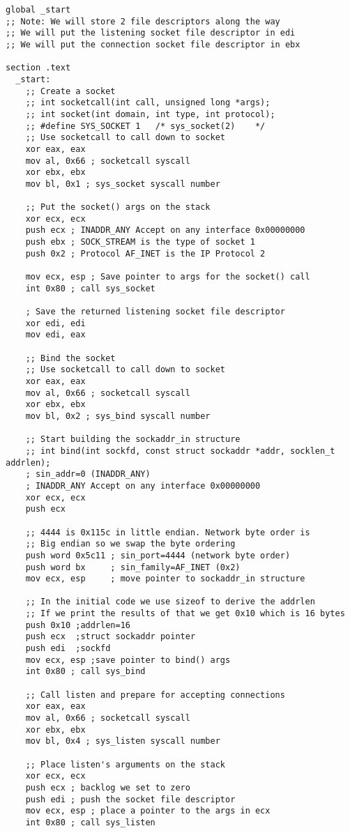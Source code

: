 \documentclass[11pt]{article}
\begin{document}
\begin{verbatim}
global _start
;; Note: We will store 2 file descriptors along the way
;; We will put the listening socket file descriptor in edi
;; We will put the connection socket file descriptor in ebx

section .text
  _start:
    ;; Create a socket
    ;; int socketcall(int call, unsigned long *args);
    ;; int socket(int domain, int type, int protocol);
    ;; #define SYS_SOCKET 1   /* sys_socket(2)    */
    ;; Use socketcall to call down to socket
    xor eax, eax
    mov al, 0x66 ; socketcall syscall
    xor ebx, ebx
    mov bl, 0x1 ; sys_socket syscall number

    ;; Put the socket() args on the stack
    xor ecx, ecx
    push ecx ; INADDR_ANY Accept on any interface 0x00000000
    push ebx ; SOCK_STREAM is the type of socket 1
    push 0x2 ; Protocol AF_INET is the IP Protocol 2

    mov ecx, esp ; Save pointer to args for the socket() call
    int 0x80 ; call sys_socket

    ; Save the returned listening socket file descriptor
    xor edi, edi
    mov edi, eax

    ;; Bind the socket
    ;; Use socketcall to call down to socket
    xor eax, eax
    mov al, 0x66 ; socketcall syscall
    xor ebx, ebx
    mov bl, 0x2 ; sys_bind syscall number

    ;; Start building the sockaddr_in structure
    ;; int bind(int sockfd, const struct sockaddr *addr, socklen_t addrlen);
    ; sin_addr=0 (INADDR_ANY)
    ; INADDR_ANY Accept on any interface 0x00000000
    xor ecx, ecx
    push ecx

    ;; 4444 is 0x115c in little endian. Network byte order is
    ;; Big endian so we swap the byte ordering
    push word 0x5c11 ; sin_port=4444 (network byte order)
    push word bx     ; sin_family=AF_INET (0x2)
    mov ecx, esp     ; move pointer to sockaddr_in structure

    ;; In the initial code we use sizeof to derive the addrlen
    ;; If we print the results of that we get 0x10 which is 16 bytes
    push 0x10 ;addrlen=16
    push ecx  ;struct sockaddr pointer
    push edi  ;sockfd
    mov ecx, esp ;save pointer to bind() args
    int 0x80 ; call sys_bind

    ;; Call listen and prepare for accepting connections
    xor eax, eax
    mov al, 0x66 ; socketcall syscall
    xor ebx, ebx
    mov bl, 0x4 ; sys_listen syscall number

    ;; Place listen's arguments on the stack
    xor ecx, ecx
    push ecx ; backlog we set to zero
    push edi ; push the socket file descriptor
    mov ecx, esp ; place a pointer to the args in ecx
    int 0x80 ; call sys_listen


\end{verbatim}
\end{document}
